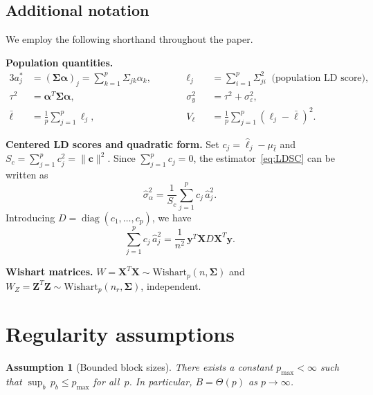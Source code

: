 \documentclass[11pt]{article}
\newcommand{\diag}{\operatorname{diag}}
\newcommand{\X}{\bm{X}}
\newcommand{\Z}{\bm{Z}}
\newcommand{\y}{\bm{y}}
\newcommand{\bSig}{\bm{\Sigma}}
\newcommand{\bal}{\bm{\alpha}}
\newcommand{\bc}{\bm{c}}
\newtheorem{assumption}{Assumption}[section]
\begin{document}
\subsection{Additional notation}\label{ssec:notation}

We employ the following shorthand throughout the paper.

\medskip
\noindent\textbf{Population quantities.}\;
\begin{alignat}{3}
  a_j^{*} &= (\bSig\bal)_j
    = \textstyle\sum_{k=1}^{p}\Sigma_{jk}\alpha_k,
    &\qquad& \ell_j &&= \textstyle\sum_{i=1}^{p}\Sigma_{ji}^{2}
      \;\;\text{(population LD score)}, \label{eq:pop_LD}\\[2pt]
  \tau^{2} &= \bal^{T}\bSig\bal,
    && \sigma_y^{2} &&= \tau^{2}+\sigma_\varepsilon^{2},\label{eq:tau}\\[2pt]
  \bar\ell &= \textstyle\frac{1}{p}\sum_{j=1}^{p}\ell_j,
    && V_\ell &&= \textstyle\frac{1}{p}\sum_{j=1}^{p}(\ell_j-\bar\ell)^{2}.
    \label{eq:Vell}
\end{alignat}

\medskip
\noindent\textbf{Centered LD scores and quadratic form.}\;
Set $c_j=\hat\ell_j-\mu_{\hat\ell}$ and $S_c=\sum_{j=1}^{p}c_j^{2}=\|\bc\|^{2}$.
Since $\sum_{j=1}^{p}c_j=0$, the estimator~\eqref{eq:LDSC} can be written as
\begin{equation}\label{eq:LDSC2}
  \hat\sigma_\alpha^2
  = \frac{1}{S_c}\sum_{j=1}^{p}c_j\,\hat{a}_j^{2}.
\end{equation}
Introducing $D=\diag(c_1,\dots,c_p)$, we have
\begin{equation}\label{eq:quadform}
  \sum_{j=1}^{p}c_j\,\hat{a}_j^{2}
  = \frac{1}{n^{2}}\,\y^{T}\X D\X^{T}\y.
\end{equation}

\medskip
\noindent\textbf{Wishart matrices.}\;
$W=\X^{T}\X\sim\text{Wishart}_p(n,\bSig)$ and $W_Z=\Z^{T}\Z\sim\text{Wishart}_p(n_r,\bSig)$, independent.

\section{Regularity assumptions}\label{sec:assumptions}

\begin{assumption}[Bounded block sizes]\label{ass:block}
There exists a constant $p_{\max}<\infty$ such that $\sup_{b}\,p_b\le p_{\max}$
for all~$p$.  In particular, $B=\Theta(p)$ as $p\to\infty$.
\end{assumption}
\end{document}
